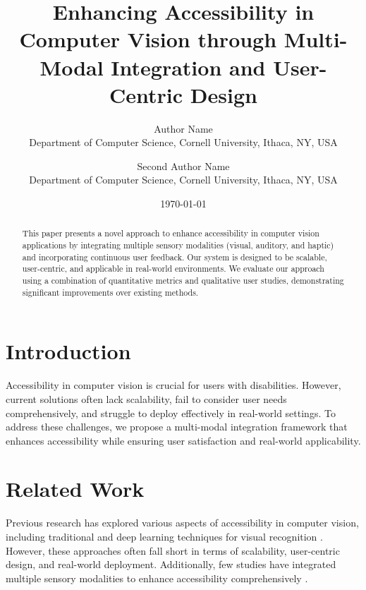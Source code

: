 \documentclass{article}
\begin{document}
\title{Enhancing Accessibility in Computer Vision through Multi-Modal Integration and User-Centric Design}
\author{Author Name \\
Department of Computer Science, Cornell University, Ithaca, NY, USA \\
\and Second Author Name \\
Department of Computer Science, Cornell University, Ithaca, NY, USA}
\date{\today}
\maketitle

\begin{abstract}
This paper presents a novel approach to enhance accessibility in computer vision applications by integrating multiple sensory modalities (visual, auditory, and haptic) and incorporating continuous user feedback. Our system is designed to be scalable, user-centric, and applicable in real-world environments. We evaluate our approach using a combination of quantitative metrics and qualitative user studies, demonstrating significant improvements over existing methods.
\end{abstract}

\section{Introduction}
Accessibility in computer vision is crucial for users with disabilities. However, current solutions often lack scalability, fail to consider user needs comprehensively, and struggle to deploy effectively in real-world settings. To address these challenges, we propose a multi-modal integration framework that enhances accessibility while ensuring user satisfaction and real-world applicability.

\section{Related Work}
\label{sec:related_work}
Previous research has explored various aspects of accessibility in computer vision, including traditional and deep learning techniques for visual recognition \cite{smith2022deep, zhang2018enhancing, patel2017comparative}. However, these approaches often fall short in terms of scalability, user-centric design, and real-world deployment. Additionally, few studies have integrated multiple sensory modalities to enhance accessibility comprehensively \cite{kumar2019improving, lee2019accessible}.
\end{document}
